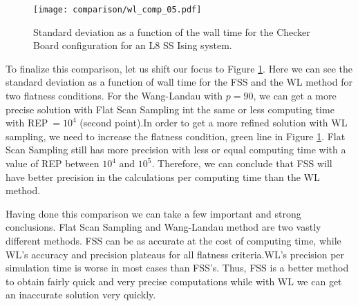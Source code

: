 \begin{figure}[h]
	\centering
	\texttt{[image: comparison/wl\_comp\_05.pdf]}
	\caption{Standard deviation as a function of the wall time for the Checker Board configuration for an L8 SS Ising system.}
	\label{time_std}
\end{figure}

	To finalize this comparison, let us shift our focus to Figure \ref{time_std}. Here we can see the standard deviation as a function of wall time for the FSS and the WL method for two flatness conditions. For the Wang-Landau with $p=90$, we can get a more precise solution with Flat Scan Sampling int the same or less computing time with REP$\ =10^4$ (second point).In order to get a more refined solution with WL sampling, we need to increase the flatness condition, green line in Figure \ref{time_std}. Flat Scan Sampling still has more precision with less or equal computing time with a value of REP between $10^4$ and $10^5$. Therefore,  we can conclude that FSS will have better precision in the calculations per computing time than the WL method.

	Having done this comparison we can take a few important and strong conclusions. Flat Scan Sampling and Wang-Landau method are two vastly different methods. FSS can be as accurate at the cost of computing time, while WL's accuracy and precision plateaus for all flatness criteria.WL's precision per simulation time is worse in most cases than FSS's. Thus, FSS is a better method to obtain fairly quick and very precise computations while with WL we can get an inaccurate solution very quickly.









